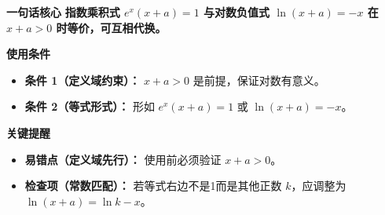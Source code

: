 \begin{summarybox}
	\textbf{\textcolor{CSummary}{一句话核心}}
	\textbf{指数乘积式 $e^{x}(x+a)=1$ 与对数负值式 $\ln(x+a)=-x$ 在 $x+a>0$ 时等价，可互相代换。}

	\medskip
	\textbf{\textcolor{CSummary}{使用条件}}
	\begin{itemize}[leftmargin=*,itemsep=0.5em,topsep=0.4em]
		\item \textbf{条件 1（定义域约束）：} $x+a>0$ 是前提，保证对数有意义。
		\item \textbf{条件 2（等式形式）：} 形如 $e^{x}(x+a)=1$ 或 $\ln(x+a)=-x$。
	\end{itemize}

	\medskip
	\textbf{\textcolor{CSummary}{关键提醒}}
	\begin{itemize}[leftmargin=*,itemsep=0.5em,topsep=0.4em]
		\item \textbf{易错点（定义域先行）：} 使用前必须验证 $x+a>0$。
		\item \textbf{检查项（常数匹配）：} 若等式右边不是1而是其他正数 $k$，应调整为 $\ln(x+a)=\ln k - x$。
	\end{itemize}

\end{summarybox}
